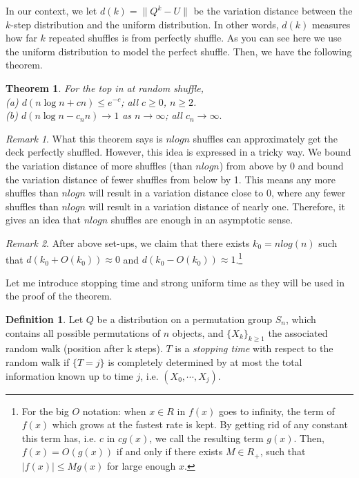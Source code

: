 \documentclass[12pt]{article}
\theoremstyle{plain}
\newtheorem{theorem}{Theorem}
\theoremstyle{definition}
\newtheorem{definition}{Definition}
\theoremstyle{remark}
\newtheorem*{remark}{Remark}
\begin{document}
In our context, we let $d(k)=\big\|Q^k-U\big\|$ be the variation distance between the $k$-step distribution and the uniform distribution. In other words, $d(k)$ measures how far $k$ repeated shuffles is from perfectly shuffle. As you can see here we use the uniform distribution to model the perfect shuffle. Then, we have the following theorem.

\begin{theorem} \cite[Theorem~1 on \pno~335]{1.1}
For the top in at random shuffle,\\
(a) $d(n\log n + cn)\leq e^{-c}$; all $c\geq 0$, $n \geq 2$.\\
(b) $d(n\log n - c_nn)\rightarrow 1$ as $n\rightarrow \infty$; all $c_n \rightarrow \infty.$
\end{theorem}

\begin{remark}
What this theorem says is $nlogn$ shuffles can approximately get the deck perfectly shuffled. However, this idea is expressed in a tricky way. We bound the variation distance of more shuffles (than $nlogn$) from above by 0 and bound the variation distance of fewer shuffles from below by 1. This means any more shuffles than $nlogn$ will result in a variation distance close to 0, where any fewer shuffles than $nlogn$ will result in a variation distance of nearly one. Therefore, it gives an idea that $nlogn$ shuffles are enough in an asymptotic sense.
\end{remark}

\begin{remark}\cite{1.1}
After above set-ups, we claim that there exists $k_0=nlog(n)$ such that $d(k_0+O(k_0))\approx0$ and $d(k_0-O(k_0))\approx1$.\footnote{For the big $O$ notation: when $x\in R$ in $f(x)$ goes to infinity, the term of $f(x)$ which grows at the fastest rate is kept. By getting rid of any constant this term has, i.e. $c$ in $cg(x)$, we call the resulting term $g(x)$. Then, $f(x)=O(g(x))$ if and only if there exists $M \in R_+$, such that  $|f(x)|\leq Mg(x)$ for large enough $x$.  } 
\end{remark}

Let me introduce stopping time and strong uniform time as they will be used in the proof of the theorem.
\begin{definition}
  Let $Q$ be a distribution on a permutation group $S_n$, which contains all possible permutations of $n$ objects, and $\{X_k\}_{k\geq1}$ the associated random walk (position after k steps). $T$ is a \textit{stopping time} with respect to the random walk if $\{T=j\}$ is completely determined by at most the total information known up to time $j$, i.e. $(X_0,\cdots,X_j)$.
\end{definition}
\end{document}
